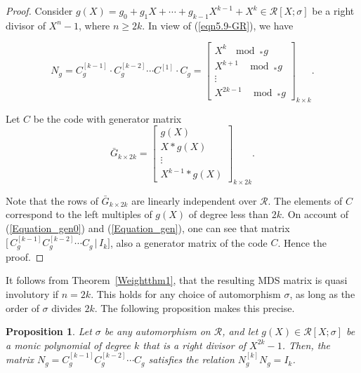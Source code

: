 \documentclass[11pt]{article}
\newtheorem{proposition}{Proposition}
\begin{document}
\begin{proof} 
Consider \(g(X)=g_0+g_1X+\cdots+g_{k-1}X^{k-1}+X^k\in \mathcal{R}[X;\sigma]\) be a right divisor of $X^{n}-1$, where $n\geq 2k$. In view of (\ref{eqn5.9-GR}), we have

	$$N_g=C^{[k-1]}_g\cdot C^{[k-2]}_g\cdots C^{[1]}\cdot C_g=\begin{bmatrix}
		X^k~ \mod _*g  \\
		X^{k+1}~\ \mod _*g  \\
		\vdots\\
		X^{2k-1}~\ \mod _*g  
	\end{bmatrix}_{k\times k}.$$

    Let $C$ be the code with generator matrix
    $$\bar{G}_{k \times 2k}=\begin{bmatrix}
		g(X)\\
        X\ast g(X)\\
        \vdots\\
        X^{k-1}\ast g(X)
	\end{bmatrix}_{k\times 2k}.$$
    
    Note that the rows of $\bar{G}_{k\times 2k}$ are linearly independent over \(\mathcal{R}\). The elements of \(C\) correspond to the left multiples of \(g(X)\) of degree less than \(2k\). On account of (\ref{Equation_gen0}) and (\ref{Equation_gen}), one can see that matrix  $\big[\, C_g^{[k-1]} C_g^{[k-2]} \cdots C_g \,\big|\, I_k \big]$, also a generator matrix of the code $C$. Hence the proof. 
	   \end{proof}


It follows from Theorem~\ref{Weightthm1}, that the resulting MDS matrix is  quasi involutory if $n=2k$. This holds for any choice of automorphism $\sigma$, as long as the order of $\sigma$ divides $2k$. The following proposition makes this precise.

 \begin{proposition}\label{quasiinvolutory} Let $\sigma$ be any automorphism on $\mathcal{R}$, and let $g(X) \in \mathcal{R}[X; \sigma]$ be a monic polynomial of degree $k$ that is a right divisor of $X^{2k}-1$. Then, the matrix $N_g = C_g^{[k-1]} C_g^{[k-2]} \cdots C_g$ satisfies the relation $N_g^{[k]}N_g = I_k$.
  \end{proposition}
 
\end{document}
